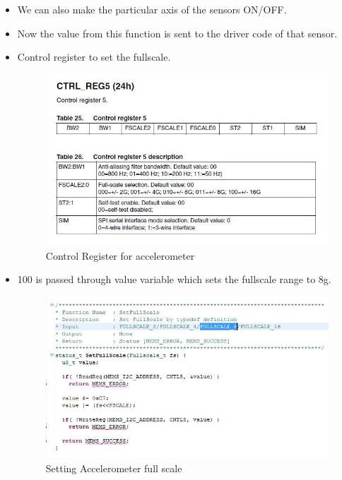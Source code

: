 \documentclass[11pt,a4paper]{article}
\begin{document}
\begin{itemize}
	\item We can also make the particular axis of the sensors ON/OFF. 
	
	\item Now the value from this function is sent to the driver code of that sensor.
	
	\newpage
	
	\item Control register to set the fullscale.
	 
	\begin{figure}[h]
    \centering
	\includegraphics[scale=0.6]{setting_range1.JPG}
	\caption{Control Register for accelerometer}
	\end{figure}
	
	\item 100 is passed through value variable which sets the fullscale range to 8g.
	
	 \begin{figure}[h]
    \centering
	\includegraphics[scale=0.6]{setting_range0.JPG}
	\caption{Setting Accelerometer full scale} 
	\end{figure}
	

\end{itemize}
\end{document}
